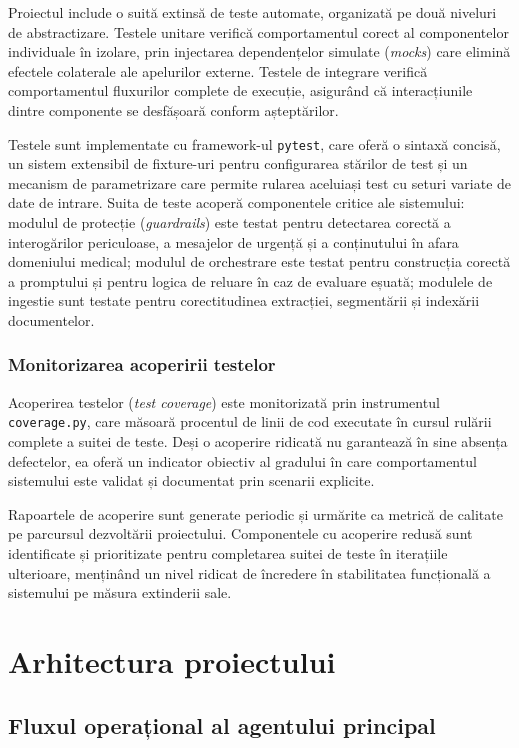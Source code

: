 \documentclass[12pt, a4paper, oneside, romanian]{teza-upb}
\begin{document}
Proiectul include o suită extinsă de teste automate, organizată pe două niveluri de abstractizare. Testele unitare verifică comportamentul corect al componentelor individuale în izolare, prin injectarea dependențelor simulate (\textit{mocks}) care elimină efectele colaterale ale apelurilor externe. Testele de integrare verifică comportamentul fluxurilor complete de execuție, asigurând că interacțiunile dintre componente se desfășoară conform așteptărilor.

Testele sunt implementate cu framework-ul \texttt{pytest}, care oferă o sintaxă concisă, un sistem extensibil de fixture-uri pentru configurarea stărilor de test și un mecanism de parametrizare care permite rularea aceluiași test cu seturi variate de date de intrare. Suita de teste acoperă componentele critice ale sistemului: modulul de protecție (\textit{guardrails}) este testat pentru detectarea corectă a interogărilor periculoase, a mesajelor de urgență și a conținutului în afara domeniului medical; modulul de orchestrare este testat pentru construcția corectă a promptului și pentru logica de reluare în caz de evaluare eșuată; modulele de ingestie sunt testate pentru corectitudinea extracției, segmentării și indexării documentelor.

\subsection{Monitorizarea acoperirii testelor}

Acoperirea testelor (\textit{test coverage}) este monitorizată prin instrumentul \texttt{coverage.py}, care măsoară procentul de linii de cod executate în cursul rulării complete a suitei de teste. Deși o acoperire ridicată nu garantează în sine absența defectelor, ea oferă un indicator obiectiv al gradului în care comportamentul sistemului este validat și documentat prin scenarii explicite.

Rapoartele de acoperire sunt generate periodic și urmărite ca metrică de calitate pe parcursul dezvoltării proiectului. Componentele cu acoperire redusă sunt identificate și prioritizate pentru completarea suitei de teste în iterațiile ulterioare, menținând un nivel ridicat de încredere în stabilitatea funcțională a sistemului pe măsura extinderii sale.

\chapter{Arhitectura proiectului}
\section{Fluxul operațional al agentului principal}
\end{document}
